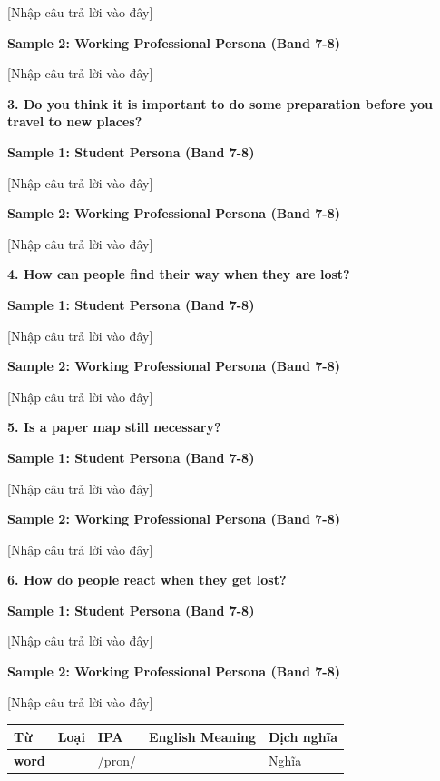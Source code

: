 [Nhập câu trả lời vào đây]

\textbf{Sample 2: Working Professional Persona (Band 7-8)}

[Nhập câu trả lời vào đây]

\separator

\begin{ieltsquestion}
\textbf{3. Do you think it is important to do some preparation before you travel to new places?}
\end{ieltsquestion}
\textbf{Sample 1: Student Persona (Band 7-8)}

[Nhập câu trả lời vào đây]

\textbf{Sample 2: Working Professional Persona (Band 7-8)}

[Nhập câu trả lời vào đây]

\separator

\begin{ieltsquestion}
\textbf{4. How can people find their way when they are lost?}
\end{ieltsquestion}
\textbf{Sample 1: Student Persona (Band 7-8)}

[Nhập câu trả lời vào đây]

\textbf{Sample 2: Working Professional Persona (Band 7-8)}

[Nhập câu trả lời vào đây]

\separator

\begin{ieltsquestion}
\textbf{5. Is a paper map still necessary?}
\end{ieltsquestion}
\textbf{Sample 1: Student Persona (Band 7-8)}

[Nhập câu trả lời vào đây]

\textbf{Sample 2: Working Professional Persona (Band 7-8)}

[Nhập câu trả lời vào đây]

\separator

\begin{ieltsquestion}
\textbf{6. How do people react when they get lost?}
\end{ieltsquestion}
\textbf{Sample 1: Student Persona (Band 7-8)}

[Nhập câu trả lời vào đây]

\textbf{Sample 2: Working Professional Persona (Band 7-8)}

[Nhập câu trả lời vào đây]

\separator


\vspace{0.8em}
\begin{center}
\renewcommand{\arraystretch}{1.65}
\begin{tabularx}{\textwidth}{|V{0.22\textwidth}|C{0.07\textwidth}|I{0.20\textwidth}|Y|V{0.18\textwidth}|}
\hline
{}
\textbf{Từ} & \textbf{Loại} & \textbf{IPA} & \textbf{English Meaning} & \textbf{Dịch nghĩa} \\
\hline
\textbf{word} & & /pron/ & & Nghĩa \\ \hline
\end{tabularx}
\end{center}

